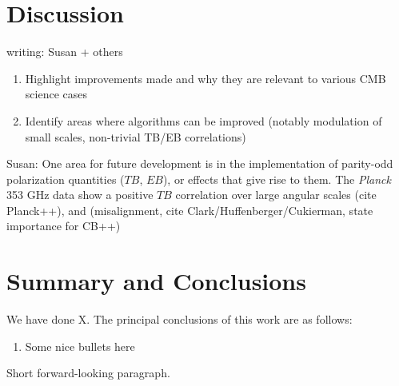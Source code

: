 \documentclass[twocolumn]{aastex631}
\begin{document}
\section{Discussion} \label{sec:discussion}
writing: Susan + others

\begin{enumerate}
    \item Highlight improvements made and why they are relevant to various CMB science cases
    \item Identify areas where algorithms can be improved (notably modulation of small scales, non-trivial TB/EB correlations)
\end{enumerate}

Susan:
One area for future development is in the implementation of parity-odd polarization quantities ($TB$, $EB$), or effects that give rise to them. The \textit{Planck} 353 GHz data show a positive $TB$ correlation over large angular scales (cite Planck++), and (misalignment, cite Clark/Huffenberger/Cukierman, state importance for CB++)


\section{Summary and Conclusions} \label{sec:summary}

We have done X. The principal conclusions of this work are as follows:

\begin{enumerate}
    \item Some nice bullets here
\end{enumerate}

Short forward-looking paragraph.


\end{document}
